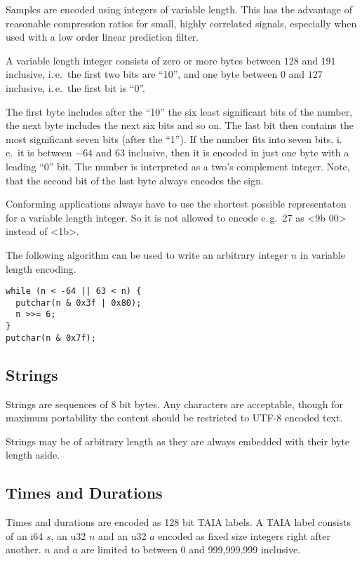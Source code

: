 \documentclass[DIV=10]{scrartcl}
\begin{document}
Samples are encoded using integers of variable length.
This has the advantage of reasonable compression ratios for small, highly correlated signals, especially when used with a low order linear prediction filter.

A variable length integer consists of zero or more bytes between \(128\) and \(191\) inclusive, i.\,e.\ the first two bits are “10”, and one byte between \(0\) and \(127\) inclusive, i.\,e.\ the first bit is “0”.

The first byte includes after the “10” the six least significant bits of the number, the next byte includes the next six bits and so on.
The last bit then contains the most significant seven bits (after the “1”).
If the number fits into seven bits, i.\,e.\ it is between \(-64\) and \(63\) inclusive, then it is encoded in just one byte with a leading “0” bit.
The number is interpreted as a two’s complement integer.
Note, that the second bit of the last byte always encodes the sign.

Conforming applications always have to use the shortest possible representaton for a variable length integer.
So it is not allowed to encode e.\,g.\ 27 as <9b 00> instead of <1b>.

The following algorithm can be used to write an arbitrary integer \(n\) in variable length encoding.

\begin{verbatim}
while (n < -64 || 63 < n) {
  putchar(n & 0x3f | 0x80);
  n >>= 6;
}
putchar(n & 0x7f);
\end{verbatim}

\subsection{Strings}

Strings are sequences of 8 bit bytes.
Any characters are acceptable, though for maximum portability the content should be restricted to UTF-8 encoded text.

Strings may be of arbitrary length as they are always embedded with their byte length aside.

\subsection{Times and Durations}

Times and durations are encoded as 128 bit TAIA labels.
A TAIA label consists of an i64 \(s\), an u32 \(n\) and an u32 \(a\) encoded as fixed size integers right after another.
\(n\) and \(a\) are limited to between 0 and 999,999,999 inclusive.
\end{document}
